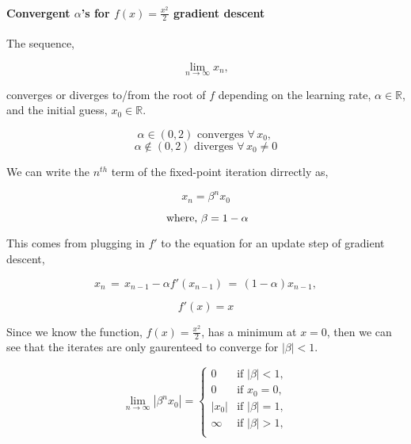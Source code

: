 \documentclass[11pt]{article}
\begin{document}
    \hypertarget{convergent-alphas-for-fx-fracx22-gradient-descent}{%
\paragraph{\texorpdfstring{Convergent \(\alpha\)'s for
\(f(x) = \frac{x^2}{2}\) gradient
descent}{Convergent \textbackslash{}alpha's for f(x) = \textbackslash{}frac\{x\^{}2\}\{2\} gradient descent}}\label{convergent-alphas-for-fx-fracx22-gradient-descent}}

    The sequence,

\[
\lim_{n \rightarrow \infty} x_n,
\]

converges or diverges to/from the root of \(f\) depending on the
learning rate, \(\alpha \in \mathbb{R}\), and the initial guess,
\(x_0 \in \mathbb{R}\).

\begin{equation}
   \alpha \in (0,2) \text{ converges } \forall \, x_0 \text{, }
\end{equation} \begin{equation}
   \alpha \notin (0,2) \text{ diverges } \forall \, x_0 \neq 0
\end{equation}

    We can write the \(n^{th}\) term of the fixed-point iteration dirrectly
as,

\begin{equation} \tag{1}
x_n = \beta^n x_0
\end{equation}

\[
\\
\text{ where, } \\
\beta = 1 - \alpha
\]

    This comes from plugging in \(f'\) to the equation for an update step of
gradient descent,

\[
    x_{n} \, = \, x_{n-1} - \alpha f'(x_{n-1}) \, = \, (1 - \alpha)x_{n-1},
\]

\[
    f'(x) = x
\]

    Since we know the function, \(f(x) = \frac{x^{2}}{2}\), has a minimum at
\(x = 0\), then we can see that the iterates are only gaurenteed to
converge for \(|\beta| < 1\).

    \[
   \lim_{n \rightarrow \infty} |\beta^n x_0| = 
\begin{cases}
    0       &   \text{if } |\beta| < 1, \\
    0       &   \text{if } x_0 = 0, \\
    |x_0|   &   \text{if } |\beta| = 1, \\
    \infty  &   \text{if } |\beta| > 1, \\
\end{cases}
\]
\end{document}
